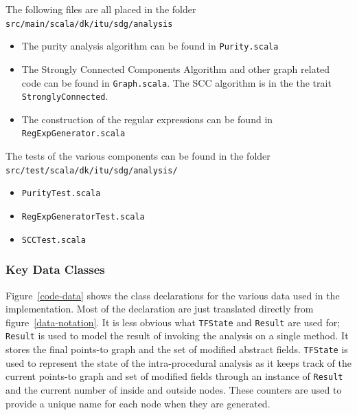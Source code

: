 \documentclass[11pt]{exam}
\begin{document}
The following files are all placed in the folder
\texttt{src/main/scala/dk/itu/sdg/analysis}

\begin{itemize}
  \setlength{\itemsep}{1pt}
  \setlength{\parskip}{0pt}
  \item The purity analysis algorithm can be found in \texttt{Purity.scala}
  \item The Strongly Connected Components Algorithm and other graph related code can be found in \texttt{Graph.scala}. The SCC algorithm is in the the trait \texttt{StronglyConnected}.
  \item The construction of the regular expressions can be 
  found in \texttt{RegExpGenerator.scala}
\end{itemize}

The tests of the various components can be found in the folder
\texttt{src/test/scala/dk/itu/sdg/analysis/}

\begin{itemize}
  \setlength{\itemsep}{1pt}
  \setlength{\parskip}{0pt}
  \item \texttt{PurityTest.scala}
  \item \texttt{RegExpGeneratorTest.scala}
  \item \texttt{SCCTest.scala}
\end{itemize}

\subsubsection*{Key Data Classes}

Figure~\ref{code-data} shows the class declarations for the various
data used in the implementation. Most of the  declaration are just
translated directly from figure~\ref{data-notation}. It is less
obvious what \texttt{TFState} and \texttt{Result} are used for;
\texttt{Result} is used to model the result of invoking the analysis on a
single method. It stores the final points-to graph and the set of
modified abstract fields. \texttt{TFState}  is used to represent the
state of the intra-procedural analysis as it  keeps track of the
current points-to graph and set of modified fields through an instance
of \texttt{Result} and the current number of inside and outside
nodes. These counters are used to provide a unique name for each node
when they are generated.
\end{document}
